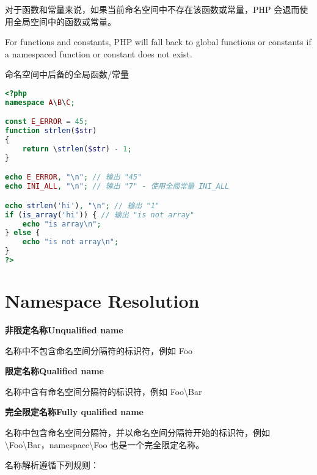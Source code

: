 对于函数和常量来说，如果当前命名空间中不存在该函数或常量，PHP 会退而使用全局空间中的函数或常量。 

For functions and constants, PHP will fall back to global functions or constants if a namespaced function or constant does not exist.

\begin{example}
命名空间中后备的全局函数/常量
\begin{lstlisting}[language=PHP]
<?php
namespace A\B\C;

const E_ERROR = 45;
function strlen($str)
{
    return \strlen($str) - 1;
}

echo E_ERROR, "\n"; // 输出 "45"
echo INI_ALL, "\n"; // 输出 "7" - 使用全局常量 INI_ALL

echo strlen('hi'), "\n"; // 输出 "1"
if (is_array('hi')) { // 输出 "is not array"
    echo "is array\n";
} else {
    echo "is not array\n";
}
?>
\end{lstlisting}
\end{example}

\chapter{Namespace Resolution}



\begin{compactitem}
\item[] \textbf{非限定名称Unqualified name}

名称中不包含命名空间分隔符的标识符，例如 Foo

\item[] \textbf{限定名称Qualified name}

名称中含有命名空间分隔符的标识符，例如 Foo\textbackslash Bar

\item[] \textbf{完全限定名称Fully qualified name}

名称中包含命名空间分隔符，并以命名空间分隔符开始的标识符，例如 \textbackslash Foo\textbackslash Bar，namespace\textbackslash Foo 也是一个完全限定名称。

\end{compactitem}

名称解析遵循下列规则：

